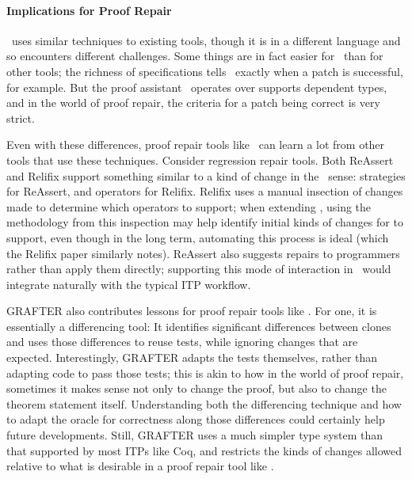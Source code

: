 \paragraph{Implications for Proof Repair}

\sysname\ uses similar techniques to existing tools, though it is in a different language
and so encounters different challenges. Some things are in fact easier for \sysname\ than for other tools;
the richness of specifications tells \sysname\ exactly when a patch is successful, for example. 
But the proof assistant \sysname\ operates over supports dependent types, and in the world of proof repair,
the criteria for a patch being correct is very strict. 

Even with these differences, proof repair tools like \sysname\ can learn a lot from other tools that use these techniques.
Consider regression repair tools. %
Both ReAssert and Relifix support something similar to a kind of change in the \sysname\ sense:
strategies for ReAssert, and operators for Relifix. Relifix uses a manual insection of changes made to determine which operators to support;
when extending \sysname, using the methodology from this inspection may help identify initial kinds of changes for \sysname to support, even though
in the long term, automating this process is ideal (which the Relifix paper similarly notes).
ReAssert also suggests repairs to programmers rather than apply them directly; %
supporting this mode of interaction in \sysname\ would integrate
naturally with the typical ITP workflow.

GRAFTER also contributes lessons for proof repair tools like \sysname.
For one, it is essentially a differencing tool: It identifies significant differences between clones and uses those differences
to reuse tests, while ignoring changes that are expected. Interestingly, GRAFTER adapts the tests themselves, rather than adapting code to pass
those tests; this is akin to how in the world of proof repair, sometimes it makes sense not only to change the proof,
but also to change the theorem statement itself. Understanding both the differencing technique and how to adapt the oracle for correctness
along those differences could certainly help future developments.
Still, GRAFTER uses a much simpler type system than that supported by most ITPs like Coq, and restricts the kinds of changes allowed relative to what
is desirable in a proof repair tool like \sysname. %

